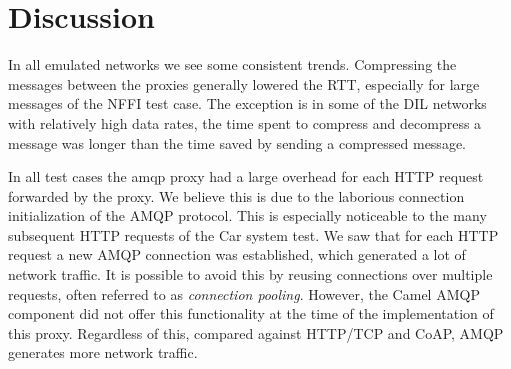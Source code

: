 \begin{landscape}
    \begin{figure}
    \centering
    \begin{floatrow}
    \end{floatrow}
    \end{figure}
\end{landscape}

\section{Discussion}
\label{section:evaluation-discussion}

In all emulated networks we see some consistent trends. Compressing the messages
between the proxies generally lowered the RTT, especially for large messages of
the NFFI test case. The exception is in some of the DIL networks with relatively
high data rates, the time spent to compress and decompress a message was longer
than the time saved by sending a compressed message.

In all test cases the \gls{amqp} proxy had a large overhead for each HTTP request
forwarded by the proxy. We believe this is due to the laborious connection
initialization of the AMQP protocol. This is especially noticeable to the many
subsequent HTTP requests of the Car system test. We saw that for each HTTP
request a new AMQP connection was established, which generated a lot of network
traffic. It is possible to avoid this by reusing connections over multiple
requests, often referred to as \textit{connection pooling}. However, the Camel
AMQP component did not offer this functionality at the time of the
implementation of this proxy. Regardless of this, compared against HTTP/TCP and
CoAP, AMQP generates more network traffic.

